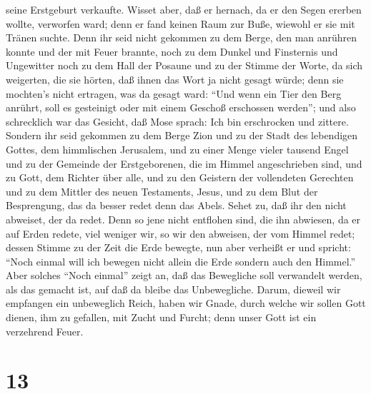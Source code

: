 seine Erstgeburt verkaufte.  Wisset aber, daß er hernach,
da er den Segen ererben wollte, verworfen ward; denn er fand keinen Raum
zur Buße, wiewohl er sie mit Tränen suchte.  Denn ihr seid
nicht gekommen zu dem Berge, den man anrühren konnte und der mit Feuer
brannte, noch zu dem Dunkel und Finsternis und Ungewitter 
noch zu dem Hall der Posaune und zu der Stimme der Worte, da sich
weigerten, die sie hörten, daß ihnen das Wort ja nicht gesagt würde;
 denn sie mochten's nicht ertragen, was da gesagt ward:
``Und wenn ein Tier den Berg anrührt, soll es gesteinigt oder mit einem
Geschoß erschossen werden'';  und also schrecklich war das
Gesicht, daß Mose sprach: Ich bin erschrocken und zittere. 
Sondern ihr seid gekommen zu dem Berge Zion und zu der Stadt des
lebendigen Gottes, dem himmlischen Jerusalem, und zu einer Menge vieler
tausend Engel  und zu der Gemeinde der Erstgeborenen, die
im Himmel angeschrieben sind, und zu Gott, dem Richter über alle, und zu
den Geistern der vollendeten Gerechten  und zu dem Mittler
des neuen Testaments, Jesus, und zu dem Blut der Besprengung, das da
besser redet denn das Abels.  Sehet zu, daß ihr den nicht
abweiset, der da redet. Denn so jene nicht entflohen sind, die ihn
abwiesen, da er auf Erden redete, viel weniger wir, so wir den abweisen,
der vom Himmel redet;  dessen Stimme zu der Zeit die Erde
bewegte, nun aber verheißt er und spricht: ``Noch einmal will ich
bewegen nicht allein die Erde sondern auch den Himmel.'' 
Aber solches ``Noch einmal'' zeigt an, daß das Bewegliche soll
verwandelt werden, als das gemacht ist, auf daß da bleibe das
Unbewegliche.  Darum, dieweil wir empfangen ein unbeweglich
Reich, haben wir Gnade, durch welche wir sollen Gott dienen, ihm zu
gefallen, mit Zucht und Furcht;  denn unser Gott ist ein
verzehrend Feuer.

\hypertarget{section-12}{%
\section{13}\label{section-12}}

